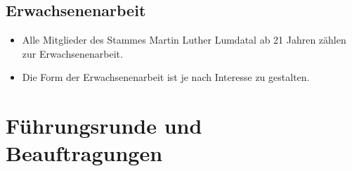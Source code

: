 \documentclass[a4paper]{article}
\begin{document}
    \subsection{Erwachsenenarbeit} %
    \label{sub:erwachsenenarbeit}
	\begin{itemize}
		\item Alle Mitglieder des Stammes Martin Luther Lumdatal ab 21 Jahren zählen zur Erwachsenenarbeit. 
		\item Die Form der Erwachsenenarbeit ist je nach Interesse zu gestalten. 
	\end{itemize}

\section{Führungsrunde und Beauftragungen} %
\label{sec:fuhrungsrunde_und_beauftragungen}
\end{document}
